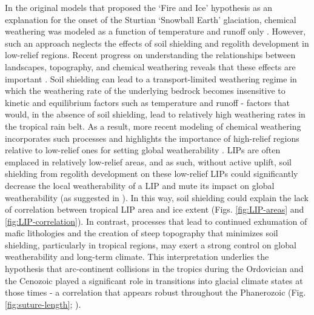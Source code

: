 In the original models that proposed the `Fire and Ice' hypothesis as an explanation for the onset of the Sturtian `Snowball Earth' glaciation, chemical weathering was modeled as a function of temperature and runoff only \citep{Donnadieu2004a}. However, such an approach neglects the effects of soil shielding and regolith development in low-relief regions. Recent progress on understanding the relationships between landscapes, topography, and chemical weathering reveals that these effects are important \citep{Gabet2009a, Hartmann2014a, Maher2014a, Godderis2017b}. Soil shielding can lead to a transport-limited weathering regime in which the weathering rate of the underlying bedrock becomes insensitive to kinetic and equilibrium factors such as temperature and runoff - factors that would, in the absence of soil shielding, lead to relatively high weathering rates in the tropical rain belt. As a result, more recent modeling of chemical weathering incorporates such processes and highlights the importance of high-relief regions relative to low-relief ones for setting global weatherability \citep{West2012a, Godderis2017b}. LIPs are often emplaced in relatively low-relief areas, and as such, without active uplift, soil shielding from regolith development on these low-relief LIPs could significantly decrease the local weatherability of a LIP and mute its impact on global weatherability (as suggested in \citealp{Kent2013a}). In this way, soil shielding could explain the lack of correlation between tropical LIP area and ice extent (Figs. \ref{fig:LIP-areas} and \ref{fig:LIP-correlation}). In contrast, processes that lead to continued exhumation of mafic lithologies and the creation of steep topography that minimizes soil shielding, particularly in tropical regions, may exert a strong control on global weatherability and long-term climate. This interpretation underlies the hypothesis that arc-continent collisions in the tropics during the Ordovician \citep{Swanson-Hysell2017a} and the Cenozoic \citep{Jagoutz2016a} played a significant role in transitions into glacial climate states at those times - a correlation that appears robust throughout the Phanerozoic (Fig. \ref{fig:suture-length}; \citealp{Macdonald2019a}).

